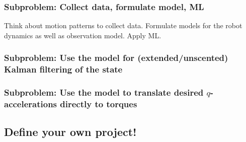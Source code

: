 \documentclass[10pt,fleqn,twoside]{article}
\begin{document}
\subsubsection{Subproblem: Collect data, formulate model, ML}

Think about motion patterns to collect data. Formulate models for the
robot dynamics as well as observation model. Apply ML.

\subsubsection{Subproblem: Use the model for (extended/unscented)
  Kalman filtering of the state}


\subsubsection{Subproblem: Use the model to translate desired
  $q$-accelerations directly to torques}



\subsection{Define your own project!}
\end{document}

